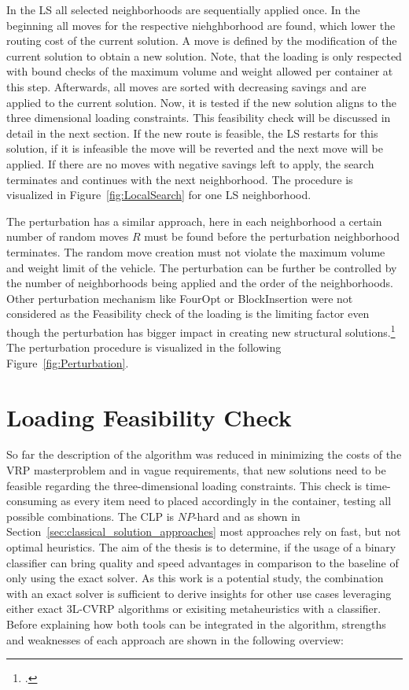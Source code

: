In the \gls{LS} all selected neighborhoods are sequentially applied once. In the beginning all moves for the respective niehghborhood
are found, which lower the routing cost of the current solution. A move is defined by the modification of the current solution to
obtain a new solution. Note, that the loading is only respected with bound checks of the maximum volume and weight
allowed per container at this step.
Afterwards, all moves are sorted with decreasing savings and are applied to the current solution. Now, it is tested
if the new solution aligns to the three dimensional loading constraints. This feasibility check will be discussed in
detail in the next section. If the new route is feasible, the \gls{LS} restarts for this solution, if it is infeasible
the move will be reverted and the next move will be applied. If there are no moves with negative savings left to apply, the search
terminates and continues with the next neighborhood. The procedure is visualized in Figure~\ref{fig:LocalSearch} for one \gls{LS} neighborhood.


The perturbation has a similar approach, here in each neighborhood a certain number of random moves $R$ must be found
before the perturbation neighborhood terminates. The random move creation must not violate the maximum volume and weight limit of the vehicle.
The perturbation can be further be controlled by the number of neighborhoods being applied and the order of the neighborhoods.
Other perturbation mechanism like FourOpt or BlockInsertion were not considered as the Feasibility check of the loading is the limiting factor even though
the perturbation has bigger impact in creating new structural solutions.\footcite[cf.][pp. 329-332]{lourenco_iterated_2003}
The perturbation procedure is visualized in the following Figure~\ref{fig:Perturbation}.



\section{Loading Feasibility Check}
\label{sec:FeasibilityCheck}
So far the description of the algorithm was reduced in minimizing the costs of the \gls{VRP} masterproblem and in vague
requirements, that new solutions need to be feasible regarding the three-dimensional loading constraints.
This check is time-consuming as every item need to placed accordingly in the container, testing all possible combinations.
The \gls{CLP} is $NP$-hard and as shown in Section~\ref{sec:classical_solution_approaches} most approaches rely on fast, but not
optimal heuristics. The aim of the thesis is to determine, if the usage of a binary classifier can bring quality and
speed advantages in comparison to the baseline of only using the exact solver.
As this work is a potential study, the combination with an exact solver is sufficient to derive insights for other use cases
leveraging either exact \gls{3L-CVRP} algorithms or exisiting metaheuristics with a classifier.
Before explaining how both tools can be integrated in the algorithm, strengths and weaknesses of
each approach are shown in the following overview:

